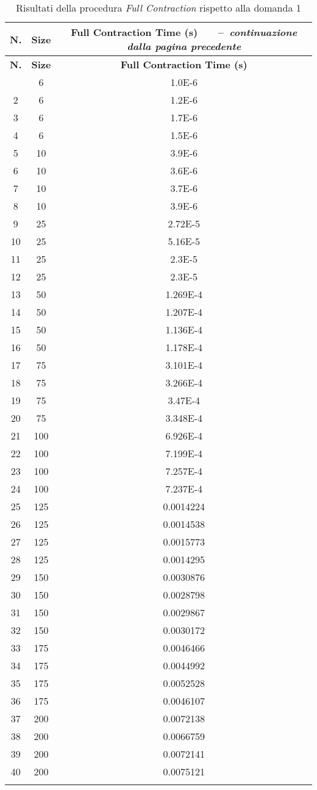 \begin{center}
	\begin{longtable}{|c|c|c|}	
		\hline
		\textbf{N.} & \textbf{Size} & \textbf{Full Contraction Time (s)}
		\endfirsthead
		{\tablename\ \thetable\ \ --\  \textit{continuazione dalla pagina precedente}} \\
		\hline
		\textbf{N.} & \textbf{Size} & \textbf{Full Contraction Time (s)}
		\endhead
		\hline {\textit{Continua nella pagina seguente}} \\
		\endfoot  
		\endlastfoot
		\hline
		1 &	6 & 1.0E-6\\
		2 &	6 & 1.2E-6\\
		3 &	6 & 1.7E-6\\
		4 &	6 & 1.5E-6\\
		5 &	10 & 3.9E-6\\
		6 &	10 & 3.6E-6\\
		7 &	10 & 3.7E-6\\
		8 &	10 & 3.9E-6\\
		9 &	25 & 2.72E-5\\
		10 & 25	& 5.16E-5\\
		11 & 25	& 2.3E-5\\
		12 & 25	& 2.3E-5\\
		13 & 50	& 1.269E-4\\
		14 & 50	& 1.207E-4\\
		15 & 50	& 1.136E-4\\
		16 & 50	& 1.178E-4\\
		17 & 75	& 3.101E-4\\
		18 & 75	& 3.266E-4\\
		19 & 75	& 3.47E-4\\
		20 & 75	& 3.348E-4\\
		21 & 100 & 6.926E-4\\
		22 & 100 & 7.199E-4\\
		23 & 100 & 7.257E-4\\
		24 & 100 & 7.237E-4\\
		25 & 125 & 0.0014224\\
		26 & 125 & 0.0014538\\
		27 & 125 & 0.0015773\\
		28 & 125 & 0.0014295\\
		29 & 150 & 0.0030876\\
		30 & 150 & 0.0028798\\
		31 & 150 & 0.0029867\\
		32 & 150 & 0.0030172\\
		33 & 175 & 0.0046466\\
		34 & 175 & 0.0044992\\
		35 & 175 & 0.0052528\\
		36 & 175 & 0.0046107\\
		37 & 200 & 0.0072138\\
		38 & 200 & 0.0066759\\
		39 & 200 & 0.0072141\\
		40 & 200 & 0.0075121\\
		\hline
		\caption{Risultati della procedura \textit{Full Contraction} rispetto alla domanda 1}
		\label{fc-results}
	\end{longtable}
\end{center}\vspace{-40pt}
